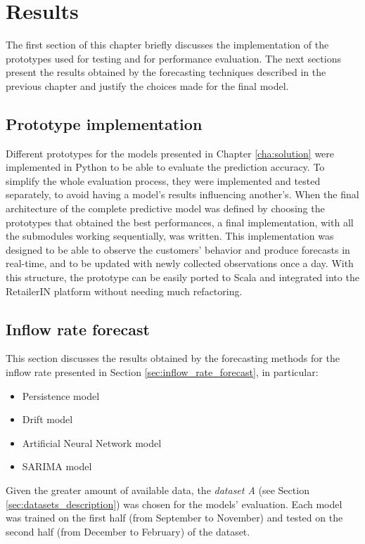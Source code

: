 \chapter{Results}
\label{cha:results}

The first section of this chapter briefly discusses the implementation of the prototypes used for testing and for performance evaluation. The next sections present the results obtained by the forecasting techniques described in the previous chapter and justify the choices made for the final model.

\section{Prototype implementation}
\label{sec:prototype_implementation}

Different prototypes for the models presented in Chapter \ref{cha:solution} were implemented in Python to be able to evaluate the prediction accuracy. To simplify the whole evaluation process, they were implemented and tested separately, to avoid having a model’s results influencing another’s. When the final architecture of the complete predictive model was defined by choosing the prototypes that obtained the best performances, a final implementation, with all the submodules working sequentially, was written. This implementation was designed to be able to observe the customers' behavior and produce forecasts in real-time, and to be updated with newly collected observations once a day. With this structure, the prototype can be easily ported to Scala and integrated into the RetailerIN platform without needing much refactoring.

\section{Inflow rate forecast}
\label{sec:inflow_rate_forecast_results}

This section discusses the results obtained by the forecasting methods for the inflow rate presented in Section \ref{sec:inflow_rate_forecast}, in particular:
\begin{itemize}
  \item Persistence model
  \item Drift model
  \item Artificial Neural Network model
  \item SARIMA model
\end{itemize}

Given the greater amount of available data, the \emph{dataset A} (see Section \ref{sec:datasets_description}) was chosen for the models' evaluation. Each model was trained on the first half (from September to November) and tested on the second half (from December to February) of the dataset.

